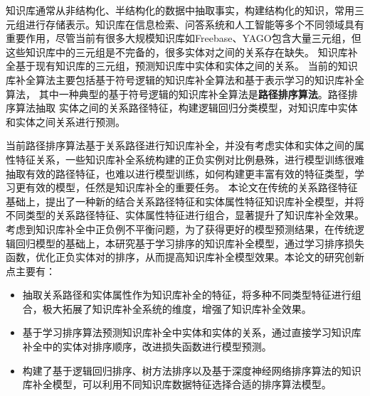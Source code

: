 


\makeatother


\makeatother



\begin{cabstract}
  知识库通常从非结构化、半结构化的数据中抽取事实，构建结构化的知识，常用三元组进行存储表示。知识库在信息检索、问答系统和人工智能等多个不同领域具有重要作用，尽管当前有很多大规模知识库如Freebase、YAGO包含大量三元组，但这些知识库中的三元组是不完备的，很多实体对之间的关系存在缺失。 
  知识库补全基于现有知识库的三元组，预测知识库中实体和实体之间的关系。
  当前的知识库补全算法主要包括基于符号逻辑的知识库补全算法和基于表示学习的知识库补全算法，
  其中一种典型的基于符号逻辑的知识库补全算法是\textbf{路径排序算法}。路径排序算法抽取
  实体之间的关系路径特征，构建逻辑回归分类模型，对知识库中实体和实体之间关系进行预测。

  当前路径排序算法基于关系路径进行知识库补全，并没有考虑实体和实体之间的属性特征关系，一些知识库补全系统构建的正负实例对比例悬殊，进行模型训练很难抽取有效的路径特征，也难以进行模型训练，如何构建更丰富有效的特征类型，学习更有效的模型，任然是知识库补全的重要任务。
  本论文在传统的关系路径特征基础上，提出了一种新的结合关系路径特征和实体属性特征知识库补全模型，并将不同类型的关系路径特征、实体属性特征进行组合，显著提升了知识库补全效果。
  考虑到知识库补全中正负例不平衡问题，为了获得更好的模型预测结果，在传统逻辑回归模型的基础上，本研究基于学习排序的知识库补全模型，通过学习排序损失函数，优化正负实体对的排序，从而提高知识库补全模型效果。本论文的研究创新点主要有：
  \begin{itemize}[$\bullet$]
    \item 抽取关系路径和实体属性作为知识库补全的特征，将多种不同类型特征进行组合，极大拓展了知识库补全系统的维度，增强了知识库补全效果。
    \item 基于学习排序算法预测知识库补全中实体和实体的关系，通过直接学习知识库补全中的实体对排序顺序，改进损失函数进行模型预测。
    \item 构建了基于逻辑回归排序、树方法排序以及基于深度神经网络排序算法的知识库补全模型，可以利用不同知识库数据特征选择合适的排序算法模型。
  \end{itemize}
\end{cabstract}

